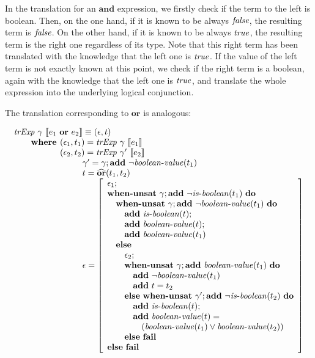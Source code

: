 In the translation for an $\mathbf{and}$ expression, we firstly check if 
the term to the left is boolean. Then, on the one hand, if it is known to be always 
$\mathit{false}$, the resulting term is $\mathit{false}$. On the other hand, if it 
is known to be always $\mathit{true}$, the resulting term is the right one 
regardless of its type. Note that this right term has been translated with the 
knowledge that the left one is $\mathit{true}$. If the value of the 
left term is not exactly known at this point, we check if the right term 
is a boolean, again with the knowledge that the left one is $\mathit{true}$,
and translate the whole expression into the underlying logical conjunction.

The translation corresponding to $\mathbf{or}$ is analogous:

\[
\begin{array}{l}
\trExp{\gamma}{\orE{e_1}{e_2}} \equiv (\epsilon, t)\\
\qquad \textbf{where }(\epsilon_1, t_1) = \trExp{\gamma}{e_1}\\
\qquad \phantom{\textbf{where }}(\epsilon_2, t_2) = \trExp{\gamma'}{e_2}\\
\qquad\qquad\qquad\qquad \gamma' = \gamma;\addE~\neg\booleanvalue{t_1}\\
\qquad\qquad\qquad\qquad t = \widehat{\mathbf{or}}(t_1, t_2)\\
\qquad\qquad\qquad\qquad \epsilon = \left[ 
\begin{array}{l}
\epsilon_1;\\
\whenUnsatW~\gamma;\addE~\neg\isboolean{t_1}~\doW\\
\quad\whenUnsatW~\gamma;\addE~\neg\booleanvalue{t_1}~\doW\\
\quad\quad\addE~\isboolean{t};\\
\quad\quad\addE~\booleanvalue{t};\\
\quad\quad\addE~\booleanvalue{t_1}\\
\quad\elseW\\
\quad\quad\epsilon_2;\\
\quad\quad\whenUnsatW~\gamma;\addE~\booleanvalue{t_1}~\doW\\
\quad\quad\quad\addE~\neg\booleanvalue{t_1}\\
\quad\quad\quad\addE~t = t_2\\
\quad\quad\elseW~\whenUnsatW~\gamma';\addE~\neg\isboolean{t_2}~\doW\\
\quad\quad\quad\addE~\isboolean{t};\\
\quad\quad\quad\addE~\booleanvalue{t} = \\
\quad\quad\quad\quad(\booleanvalue{t_1} \lor \booleanvalue{t_2})\\
\quad\quad\elseW~\failE\\
\elseW~\failE
\end{array}
\right] \\
\end{array}
\]


